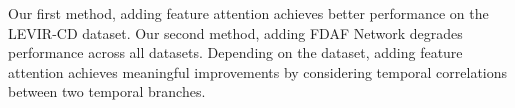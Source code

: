 \documentclass[../main.tex]{subfiles}
\begin{document}
Our first method, adding feature attention achieves better performance on the LEVIR-CD dataset. Our second method, adding FDAF Network degrades performance across all datasets. Depending on the dataset, adding feature attention achieves meaningful improvements by considering temporal correlations between two temporal branches.
\end{document}
